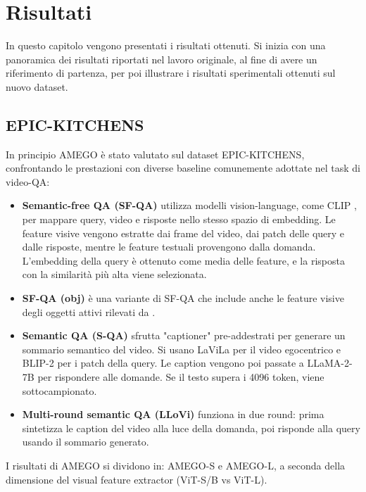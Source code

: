 \chapter{Risultati}
In questo capitolo vengono presentati i risultati ottenuti. Si inizia con una panoramica dei risultati riportati nel lavoro originale, al fine di avere un riferimento di partenza, per poi illustrare i risultati sperimentali ottenuti sul nuovo dataset.
\section{EPIC-KITCHENS}
In principio AMEGO è stato valutato sul dataset EPIC-KITCHENS, confrontando le prestazioni con diverse baseline comunemente adottate nel task di video-QA:
\begin{itemize}
    \item \textbf{Semantic-free QA (SF-QA)} utilizza modelli vision-language, come CLIP \cite{radford2021learningtransferablevisualmodels}, per mappare query, video e risposte nello stesso spazio di embedding. Le feature visive vengono estratte dai frame del video, dai patch delle query e dalle risposte, mentre le feature testuali provengono dalla domanda. L'embedding della query è ottenuto come media delle feature, e la risposta con la similarità più alta viene selezionata.
    
    \item \textbf{SF-QA (obj)} è una variante di SF-QA che include anche le feature visive degli oggetti attivi rilevati da \cite{shan2020understandinghumanhandscontact}.
    
    \item \textbf{Semantic QA (S-QA)} sfrutta "captioner" pre-addestrati per generare un sommario semantico del video. Si usano LaViLa \cite{zhao2022learningvideorepresentationslarge} per il video egocentrico e BLIP-2 \cite{li2023blip2bootstrappinglanguageimagepretraining} per i patch della query. Le caption vengono poi passate a LLaMA-2-7B \cite{touvron2023llama2openfoundation} per rispondere alle domande. Se il testo supera i 4096 token, viene sottocampionato.
    
    \item \textbf{Multi-round semantic QA (LLoVi)} \cite{zhang2024simplellmframeworklongrange} funziona in due round: prima sintetizza le caption del video alla luce della domanda, poi risponde alla query usando il sommario generato.
\end{itemize}

I risultati di AMEGO si dividono in: AMEGO-S e AMEGO-L, a seconda della dimensione del visual feature extractor (ViT-S/B vs ViT-L).

